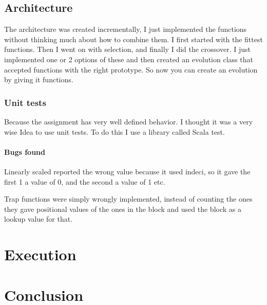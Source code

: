 \documentclass{article}
\begin{document}
\subsection{Architecture}
The architecture was created incrementally, I just implemented the functions
without thinking much about how to combine them.  I first started with the
fittest functions. Then I went on with selection, and finally I did the
crossover.
I just implemented one or 2 options of these and then created an evolution
class that accepted functions with the right prototype. So now you can
create an evolution by giving it functions.

\subsubsection{Unit tests}
Because the assignment has very well defined behavior. I thought it was
a very wise Idea to use unit tests. To do this I use a library called
Scala test.

\paragraph{Bugs found}
Linearly scaled reported the wrong value because it used indeci, so it
gave the first 1 a value of 0, and the second a value of 1 etc.

Trap functions were simply wrongly implemented, instead of counting the
ones they gave positional values of the ones in the block and used the
block as a lookup value for that.
\section{Execution}

\section{Conclusion}
\end{document}
